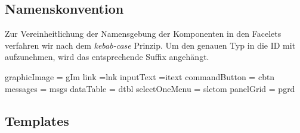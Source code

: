 \newcommand{\ftable}[1]{\begin{sidewaystable}
\begin{tabular}[H]{ |m{2cm}| m{3cm}| m{4cm}| m{6cm} |m{4cm}| m{2cm}| }
    \toprule
    \textbf{ID} & \textbf{Typ} & \textbf{Beschreibung} & \textbf{Binding} & \textbf{Constraints} & \textbf{Validator \newline Converter} \\
    \midrule
    #1
\end{tabular}
\end{sidewaystable}
}

\newcommand{\fentry}[6]{#1 & #2 & #3 & #4 & #5 & #6\\\hline}


\subsection{Namenskonvention}

Zur Vereinheitlichung der Namensgebung der Komponenten in den Facelets verfahren wir nach dem \emph{kebab-case} Prinzip. Um den genauen Typ in die ID mit aufzunehmen, wird das entsprechende Suffix angehängt.

 graphicImage = gIm link =lnk inputText =itext commandButton = cbtn messages = msgs dataTable = dtbl selectOneMenu = slctom panelGrid = pgrd

\subsection{Templates}

